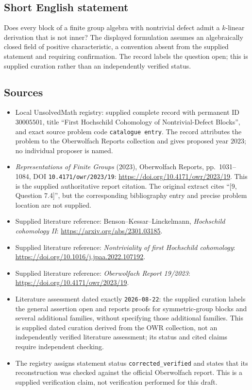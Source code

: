 \documentclass[11pt]{article}
\begin{document}
\subsection{Short English statement}
Does every block of a finite group algebra with nontrivial defect admit a \(k\)-linear derivation that is not inner? The displayed formulation assumes an algebraically closed field of positive characteristic, a convention absent from the supplied statement and requiring confirmation. The record labels the question open; this is supplied curation rather than an independently verified status.
\subsection{Sources}
\begin{itemize}
\item Local UnsolvedMath registry: supplied complete record with permanent ID \(30005501\), title ``First Hochschild Cohomology of Nontrivial-Defect Blocks'', and exact source problem code \texttt{catalogue entry}. The record attributes the problem to the Oberwolfach Reports collection and gives proposed year \(2023\); no individual proposer is named.
\item \emph{Representations of Finite Groups} (2023), Oberwolfach Reports, pp.~1031--1084, DOI \texttt{10.4171/owr/2023/19}: \url{https://doi.org/10.4171/owr/2023/19}. This is the supplied authoritative report citation. The original extract cites ``[9, Question 7.4]'', but the corresponding bibliography entry and precise problem location are not supplied.
\item Supplied literature reference: Benson--Kessar--Linckelmann, \emph{Hochschild cohomology II}: \url{https://arxiv.org/abs/2301.03185}.
\item Supplied literature reference: \emph{Nontriviality of first Hochschild cohomology}: \url{https://doi.org/10.1016/j.jpaa.2022.107192}.
\item Supplied literature reference: \emph{Oberwolfach Report 19/2023}: \url{https://doi.org/10.4171/owr/2023/19}.
\item Literature assessment dated exactly \texttt{2026-08-22}: the supplied curation labels the general assertion open and reports proofs for symmetric-group blocks and several additional families, without specifying those additional families. This is supplied dated curation derived from the OWR collection, not an independently verified literature assessment; its status and cited claims require independent checking.
\item The registry assigns statement status \texttt{corrected\_verified} and states that its reconstruction was checked against the official Oberwolfach report. This is a supplied verification claim, not verification performed for this draft.
\end{itemize}
\end{document}
